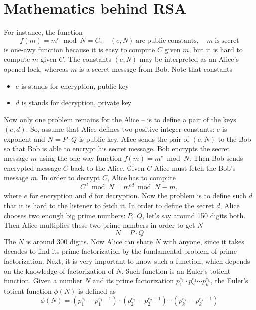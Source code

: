 \documentclass[12pt,letterpaper,oneside,reqno]{amsart}
\begin{document}
    \section{Mathematics behind RSA}\label{sec:mathematics-behind-rsa}
    For instance, the function
    \begin{equation*}
        f(m) = m^e \bmod N = C, \quad (e, N) \mathrm{\; are \; public \; constants}, \quad m \; \mathrm{is \; secret}
    \end{equation*}
    is one-awy function because it is easy to compute $C$ given $m$, but it is hard to compute $m$ given $C$.
    The constants $(e, N)$ may be interpreted as an Alice's opened lock, whereas $m$ is a secret message from Bob.
    Note that constants
    \begin{itemize}
        \item $e$ is stands for encryption, public key
        \item $d$ is stands for decryption, private key
    \end{itemize}
    Now only one problem remains for the Alice -- is to define a pair of the keys $(e, d)$.
    So, assume that Alice defines two positive integer constants: $e$ is exponent and $N = P \cdot Q$ is public key.
    Alice sends the pair of $(e, N)$ to the Bob so that Bob is able to encrypt his secret message.
    Bob encrypts the secret message $m$ using the one-way function $f(m) = m^e \bmod N$.
    Then Bob sends encrypted message $C$ back to the Alice.
    Given $C$ Alice must fetch the Bob's message $m$.
    In order to decrypt $C$, Alice has to compute
    \[
        C^d \bmod N = m^{ed} \bmod N \equiv m,
    \]
    where $e$ for encryption and $d$ for decryption.
    Now the problem is to define such $d$ that it is hard to the listener to fetch it.
    In order to define the secret $d$, Alice chooses two enough big prime numbers: $P, \; Q$, let's say around 150 digits
    both.
    Then Alice multiplies these two prime numbers in order to get $N$
    \[
        N = P \cdot Q
    \]
    The $N$ is around 300 digits.
    Now Alice can share $N$ with anyone, since it takes decades to find its prime factorization by the fundamental problem
    of prime factorization.
    Next, it is very important to know such a function, which depends on the knowledge of factorization of $N$.
    Such function is an Euler's totient function.
    Given a number $N$ and its prime factorization $p_1^{e_1}\cdot p_2^{e_2} \cdots p_k^{e_k}$, the Euler's totient function
    $\phi(N)$ is defined as
    \[
        \phi(N) = (p_1^{e_1} - p_1^{e_1 - 1}) \cdot (p_2^{e_2} - p_2^{e_2 - 1}) \cdots (p_k^{e_k} - p_k^{e_k - 1})
    \]
\end{document}
